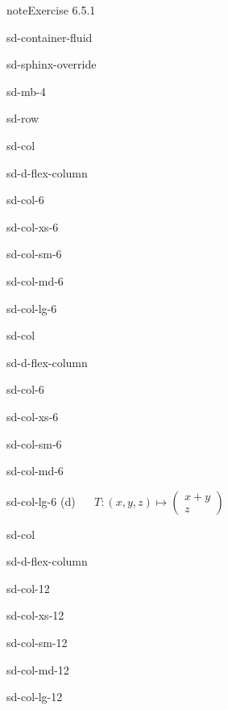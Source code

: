 \documentclass[letterpaper,10pt,english]{jupyterBook}
\begin{document}
\begin{sphinxadmonition}{note}{Exercise 6.5.1}
\begin{sphinxuseclass}{sd-container-fluid}
\begin{sphinxuseclass}{sd-sphinx-override}
\begin{sphinxuseclass}{sd-mb-4}
\begin{sphinxuseclass}{sd-row}
\begin{sphinxuseclass}{sd-col}
\begin{sphinxuseclass}{sd-d-flex-column}
\begin{sphinxuseclass}{sd-col-6}
\begin{sphinxuseclass}{sd-col-xs-6}
\begin{sphinxuseclass}{sd-col-sm-6}
\begin{sphinxuseclass}{sd-col-md-6}
\begin{sphinxuseclass}{sd-col-lg-6}
\end{sphinxuseclass}
\end{sphinxuseclass}
\end{sphinxuseclass}
\end{sphinxuseclass}
\end{sphinxuseclass}
\end{sphinxuseclass}
\end{sphinxuseclass}
\begin{sphinxuseclass}{sd-col}
\begin{sphinxuseclass}{sd-d-flex-column}
\begin{sphinxuseclass}{sd-col-6}
\begin{sphinxuseclass}{sd-col-xs-6}
\begin{sphinxuseclass}{sd-col-sm-6}
\begin{sphinxuseclass}{sd-col-md-6}
\begin{sphinxuseclass}{sd-col-lg-6}
\sphinxAtStartPar
(d)   \(T: (x, y, z) \mapsto \begin{pmatrix} x + y \\ z \end{pmatrix}\)

\end{sphinxuseclass}
\end{sphinxuseclass}
\end{sphinxuseclass}
\end{sphinxuseclass}
\end{sphinxuseclass}
\end{sphinxuseclass}
\end{sphinxuseclass}
\begin{sphinxuseclass}{sd-col}
\begin{sphinxuseclass}{sd-d-flex-column}
\begin{sphinxuseclass}{sd-col-12}
\begin{sphinxuseclass}{sd-col-xs-12}
\begin{sphinxuseclass}{sd-col-sm-12}
\begin{sphinxuseclass}{sd-col-md-12}
\begin{sphinxuseclass}{sd-col-lg-12}
\sphinxAtStartPar
 


\end{sphinxuseclass}
\end{sphinxuseclass}
\end{sphinxuseclass}
\end{sphinxuseclass}
\end{sphinxuseclass}
\end{sphinxuseclass}
\end{sphinxuseclass}
\end{sphinxuseclass}
\end{sphinxuseclass}
\end{sphinxuseclass}
\end{sphinxuseclass}
\end{sphinxadmonition}
\end{document}
